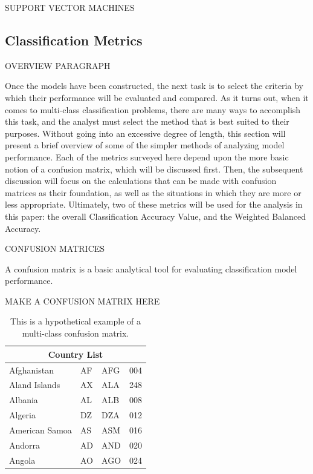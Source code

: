 \documentclass[12pt]{article}
\begin{document}
SUPPORT VECTOR MACHINES

\subsection{Classification Metrics}
\label{sec:metr}

OVERVIEW PARAGRAPH

Once the models have been constructed, the next task is to select the criteria 
by which their performance will be evaluated and compared.  As it turns out, 
when it comes to multi-class classification problems, there are many ways to 
accomplish this task, and the analyst must select the method that is best 
suited to their purposes.  Without going into an excessive degree of length, 
this section will present a brief overview of some of the simpler methods of 
analyzing model performance.  Each of the metrics surveyed here depend upon 
the more basic notion of a confusion matrix, which will be discussed first.  
Then, the subsequent discussion will focus on the calculations that can be 
made with confusion matrices as their foundation, as well as the situations 
in which they are more or less appropriate.  Ultimately, two of these metrics 
will be used for the analysis in this paper: the overall Classification 
Accuracy Value, and the Weighted Balanced Accuracy.   

CONFUSION MATRICES

A confusion matrix is a basic analytical tool for evaluating classification model performance.  

MAKE A CONFUSION MATRIX HERE
\begin{table}[tbp]
\caption{This is a hypothetical example of a multi-class confusion matrix.}
\label{tab:conf}
\centering
\begin{tabular}{ |p{3cm}||p{3cm}|p{3cm}|p{3cm}|  }
 \hline
 \multicolumn{4}{|c|}{Country List} \\
 \hline
 Afghanistan   & AF    &AFG&   004\\
 Aland Islands&   AX  & ALA   &248\\
 Albania &AL & ALB&  008\\
 Algeria    &DZ & DZA&  012\\
 American Samoa&   AS  & ASM&016\\
 Andorra& AD  & AND   &020\\
 Angola& AO  & AGO&024\\
 \hline
\end{tabular}
\end{table}
\end{document}
